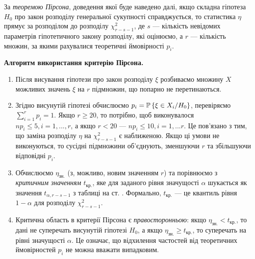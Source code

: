 За \emph{теоремою Пірсона}, доведення якої буде наведено далі, якщо складна гіпотеза $H_0$ про закон розподілу генеральної сукупності 
справджується, то статистика $\eta$ прямує за розподілом до розподілу $\chi^2_{r-s-1}$, де $s$ --- кількість невідомих параметрів гіпотетичного закону розподілу,
які оцінюємо, а $r$ --- кількість множин, за якими рахувалися теоретичні ймовірності $p_i$.

\textbf{Алгоритм використання критерію Пірсона.}
\begin{enumerate}
    \item Після висування гіпотези про закон розподілу $\xi$ розбиваємо множину $X$ можливих значень $\xi$ на $r$ підмножин, що попарно не перетинаються.
    \item Згідно висунутій гіпотезі обчислюємо $p_i = \P\left\{\xi \in X_i / H_0 \right\}$, перевіряємо $\sum\limits_{i=1}^r p_i = 1$.
    Якщо $r\geq 20$, то потрібно, щоб виконувалося $n p_i \leq 5, i = 1, ..., r$, а якщо $r<20$ --- $n p_i \leq 10, i = 1, ... r$. Це пов'язано з тим, що
    заміна розподілу $\eta$ на $\chi^2_{r-s-1}$ є наближеною. Якщо ці умови не виконуються, то сусідні підмножини об'єднують, зменшуючи $r$ та збільшуючи відповідні $p_i$.
    \item Обчислюємо $\eta_{\text{зн.}}$ (з, можливо, новим значенням $r$) та порівнюємо з \emph{критичним значенням} $t_{\text{кр.}}$, яке для заданого рівня значущості $\alpha$
    шукається як значення $t_{\alpha, r-s-1}$ з таблиці на ст. \pageref{tabel:chi_2}. Формально, $t_{\text{кр.}}$ --- це квантиль рівня $1-\alpha$ для розподілу $\chi^2_{r-s-1}$.
    \item Критична область в критерії Пірсона є \emph{правосторонньою}: якщо $\eta_{\text{зн.}} < t_{\text{кр.}}$, то дані не суперечать висунутій гіпотезі $H_0$, а якщо
    $\eta_{\text{зн.}} \geq t_{\text{кр.}}$, то суперечать на рівні значущості $\alpha$. Це означає, що відхилення частостей від теоретичних ймовірностей $p_i$ не можна вважати випадковим.
\end{enumerate}

